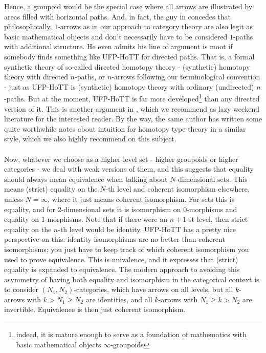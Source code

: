 Hence, a groupoid would be the special case where all arrows are illustrated by areas filled with horizontal paths.
And, in fact, the guy in \cite{e5194763} concedes that philosophically, $1$-arrows as in our approach to category theory are also legit as basic mathematical objects and don't necessarily have to be considered $1$-paths with additional structure.
He even admits his line of argument is {\glqq}moot{\grqq} if somebody finds something like UFP-HoTT for directed paths.
That is, a formal synthetic theory of so-called {\glqq}directed homotopy theory{\grqq} - (synthetic) homotopy theory with directed $n$-paths, or $n$-arrows following our terminological convention - just as UFP-HoTT is (synthetic) homotopy theory with ordinary (undirected) $n$-paths.
But at the moment, UFP-HoTT is far more developed\footnote{indeed, it is mature enough to serve as a foundation of mathematics with basic mathematical objects $\infty$-groupoids} than any directed version of it.
This is another argument in \cite{e5194763}, which we recommend as lazy weekend literature for the interested reader.
By the way, the same author has written some quite worthwhile notes \cite{2d5c2e63} about intuition for homotopy type theory in a similar style, which we also highly recommend on this subject.
\\\\
Now, whatever we choose as a higher-level set - higher groupoids or higher categories - we deal with weak versions of them, and this suggests that equality should always mean equivalence when talking about $N$-dimensional sets.
This means (strict) equality on the $N$-th level and coherent isomorphism elsewhere, unless $N = \infty$, where it just means coherent isomorphism.
For sets this is equality, and for $2$-dimensional sets it is isomorphism on $0$-morphisms and equality on $1$-morphisms.
Note that if there were an $n+1$-st level, then strict equality on the $n$-th level would be identity.
UFP-HoTT has a pretty nice perspective on this: identity isomorphisms are no better than coherent isomorphisms; you just have to keep track of which coherent isomorphism you used to prove equivalence.
This is univalence, and it expresses that (strict) equality is expanded to equivalence.
The modern approach to avoiding this asymmetry of having both equality and isomorphism in the categorical context is to consider $(N_{1},N_{2})$-categories, which have arrows on all levels, but all $k$-arrows with $k > N_{1} \geq N_{2}$ are identities, and all $k$-arrows with $N_{1} \geq k > N_{2}$ are invertible.
Equivalence is then just coherent isomorphism.
